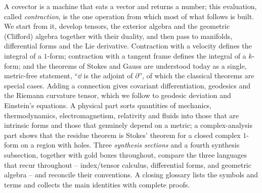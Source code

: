 \begin{center}
\begin{minipage}{0.88\textwidth}
\par\vspace{0.4em}
\small\raggedright\setlength{\parindent}{1.5em}\noindent
A covector is a machine that eats a vector and returns a number; this evaluation, called
\emph{contraction}, is the one operation from which most of what follows is built. We start from it,
develop tensors, the exterior algebra and the geometric (Clifford) algebra together with their duality,
and then pass to manifolds, differential forms and the Lie derivative. Contraction with a velocity
defines the integral of a $1$-form; contraction with a tangent frame defines the integral of a
$k$-form; and the theorems of Stokes and Gauss are understood today as a single, metric-free
statement, ``$\dd$ is the adjoint of $\partial$'', of which the classical theorems are special cases.
Adding a connection gives covariant differentiation, geodesics and the Riemann curvature tensor,
which we follow to geodesic deviation and Einstein's equations. A physical part sorts quantities
of mechanics, thermodynamics, electromagnetism, relativity and fluids into those that are intrinsic
forms and those that genuinely depend on a metric; a complex-analysis part shows that the residue
theorem is Stokes' theorem for a closed complex $1$-form on a region with holes. Three \emph{synthesis
sections} and a fourth synthesis subsection, together with gold boxes throughout, compare the three languages that recur throughout --
index/tensor calculus, differential forms, and geometric algebra -- and reconcile their conventions.
A closing glossary lists the symbols and terms and collects the main identities with complete proofs.
\end{minipage}
\end{center}
